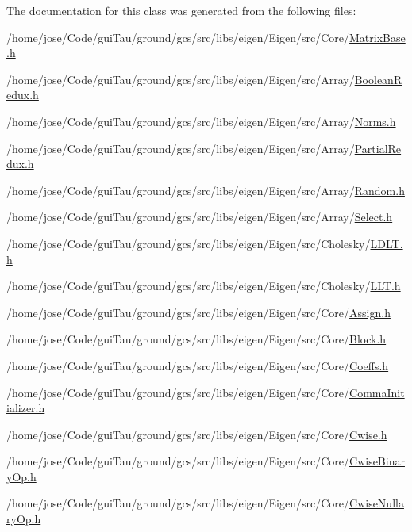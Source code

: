 The documentation for this class was generated from the following files\-:\begin{DoxyCompactItemize}
\item 
/home/jose/\-Code/gui\-Tau/ground/gcs/src/libs/eigen/\-Eigen/src/\-Core/\hyperlink{_matrix_base_8h}{Matrix\-Base.\-h}\item 
/home/jose/\-Code/gui\-Tau/ground/gcs/src/libs/eigen/\-Eigen/src/\-Array/\hyperlink{_boolean_redux_8h}{Boolean\-Redux.\-h}\item 
/home/jose/\-Code/gui\-Tau/ground/gcs/src/libs/eigen/\-Eigen/src/\-Array/\hyperlink{_norms_8h}{Norms.\-h}\item 
/home/jose/\-Code/gui\-Tau/ground/gcs/src/libs/eigen/\-Eigen/src/\-Array/\hyperlink{_partial_redux_8h}{Partial\-Redux.\-h}\item 
/home/jose/\-Code/gui\-Tau/ground/gcs/src/libs/eigen/\-Eigen/src/\-Array/\hyperlink{_random_8h}{Random.\-h}\item 
/home/jose/\-Code/gui\-Tau/ground/gcs/src/libs/eigen/\-Eigen/src/\-Array/\hyperlink{_select_8h}{Select.\-h}\item 
/home/jose/\-Code/gui\-Tau/ground/gcs/src/libs/eigen/\-Eigen/src/\-Cholesky/\hyperlink{_l_d_l_t_8h}{L\-D\-L\-T.\-h}\item 
/home/jose/\-Code/gui\-Tau/ground/gcs/src/libs/eigen/\-Eigen/src/\-Cholesky/\hyperlink{_l_l_t_8h}{L\-L\-T.\-h}\item 
/home/jose/\-Code/gui\-Tau/ground/gcs/src/libs/eigen/\-Eigen/src/\-Core/\hyperlink{_assign_8h}{Assign.\-h}\item 
/home/jose/\-Code/gui\-Tau/ground/gcs/src/libs/eigen/\-Eigen/src/\-Core/\hyperlink{_block_8h}{Block.\-h}\item 
/home/jose/\-Code/gui\-Tau/ground/gcs/src/libs/eigen/\-Eigen/src/\-Core/\hyperlink{_coeffs_8h}{Coeffs.\-h}\item 
/home/jose/\-Code/gui\-Tau/ground/gcs/src/libs/eigen/\-Eigen/src/\-Core/\hyperlink{_comma_initializer_8h}{Comma\-Initializer.\-h}\item 
/home/jose/\-Code/gui\-Tau/ground/gcs/src/libs/eigen/\-Eigen/src/\-Core/\hyperlink{_cwise_8h}{Cwise.\-h}\item 
/home/jose/\-Code/gui\-Tau/ground/gcs/src/libs/eigen/\-Eigen/src/\-Core/\hyperlink{_cwise_binary_op_8h}{Cwise\-Binary\-Op.\-h}\item 
/home/jose/\-Code/gui\-Tau/ground/gcs/src/libs/eigen/\-Eigen/src/\-Core/\hyperlink{_cwise_nullary_op_8h}{Cwise\-Nullary\-Op.\-h}\item 

\end{DoxyCompactItemize}
